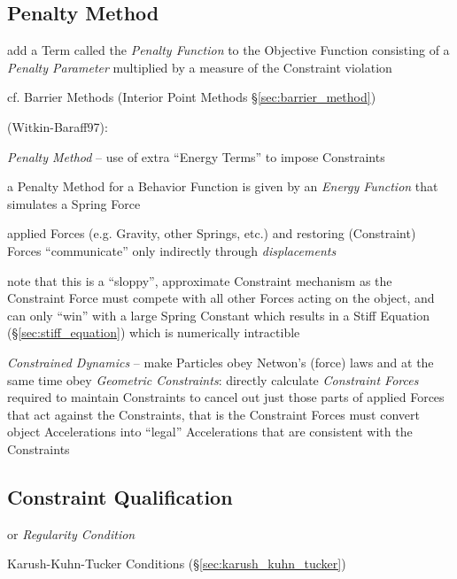 \subsection{Penalty Method}\label{sec:penalty_method}

add a Term called the \emph{Penalty Function} to the Objective Function
consisting of a \emph{Penalty Parameter} multiplied by a measure of the
Constraint violation

cf. Barrier Methods (Interior Point Methods \S\ref{sec:barrier_method})

(Witkin-Baraff97):

\emph{Penalty Method} -- use of extra ``Energy Terms'' to impose Constraints

a Penalty Method for a Behavior Function is given by an \emph{Energy Function}
that simulates a Spring Force

applied Forces (e.g. Gravity, other Springs, etc.) and restoring (Constraint)
Forces ``communicate'' only indirectly through \emph{displacements}

note that this is a ``sloppy'', approximate Constraint mechanism as the
Constraint Force must compete with all other Forces acting on the object, and
can only ``win'' with a large Spring Constant which results in a Stiff Equation
(\S\ref{sec:stiff_equation}) which is numerically intractible

\emph{Constrained Dynamics} -- make Particles obey Netwon's (force) laws and
at the same time obey \emph{Geometric Constraints}: directly calculate
\emph{Constraint Forces} required to maintain Constraints to cancel out just
those parts of applied Forces that act against the Constraints, that is the
Constraint Forces must convert object Accelerations into ``legal'' Accelerations
that are consistent with the Constraints



\subsection{Constraint Qualification}\label{sec:constraint_qualification}

or \emph{Regularity Condition}

\fist Karush-Kuhn-Tucker Conditions (\S\ref{sec:karush_kuhn_tucker})

